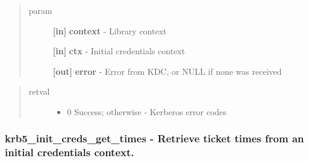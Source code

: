 \documentclass[letterpaper,10pt,english]{sphinxmanual}
\begin{document}
\begin{quote}\begin{description}
\item[{param}] \leavevmode
\textbf{{[}in{]}} \textbf{context} - Library context

\textbf{{[}in{]}} \textbf{ctx} - Initial credentials context

\textbf{{[}out{]}} \textbf{error} - Error from KDC, or NULL if none was received

\end{description}\end{quote}
\begin{quote}\begin{description}
\item[{retval}] \leavevmode\begin{itemize}
\item {} 
0   Success; otherwise - Kerberos error codes

\end{itemize}

\end{description}\end{quote}


\subsubsection{krb5\_init\_creds\_get\_times -  Retrieve ticket times from an initial credentials context.}
\label{appdev/refs/api/krb5_init_creds_get_times::doc}\label{appdev/refs/api/krb5_init_creds_get_times:krb5-init-creds-get-times-retrieve-ticket-times-from-an-initial-credentials-context}

\begin{fulllineitems}
\label{appdev/refs/api/krb5_init_creds_get_times:c.krb5_init_creds_get_times}
\end{fulllineitems}
\end{document}

